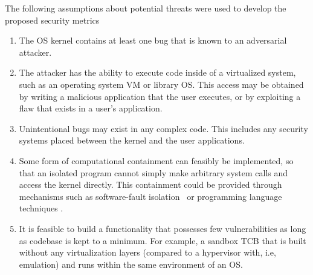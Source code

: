 The following assumptions about potential threats were used to develop the proposed
 security metrics

\begin{enumerate}
\item The OS kernel contains at least one bug that is known to an adversarial attacker.

\item The attacker has the ability to execute code inside
of a virtualized system, such as an operating system VM or library OS.
This access may be obtained by writing a malicious application
that the user executes, or by exploiting a flaw that exists in a user's
application.

\item Unintentional bugs may exist in any complex code. This
includes any security systems placed between the kernel and the user
applications.

\item Some form of computational containment can feasibly be implemented, so that an isolated program cannot simply
make arbitrary system calls and access the kernel directly. This containment could
be provided through mechanisms such as software-fault isolation~\cite{SFI:93} or programming
language techniques \cite{JS-Sandboxing1, JVM}. %

\item It is feasible to build a functionality that possesses few vulnerabilities as long as codebase is kept to a minimum.
For example, a sandbox TCB that is built without any virtualization layers (compared to a hypervisor with, i.e, emulation)
and runs within the same environment of an OS.

\end{enumerate}
